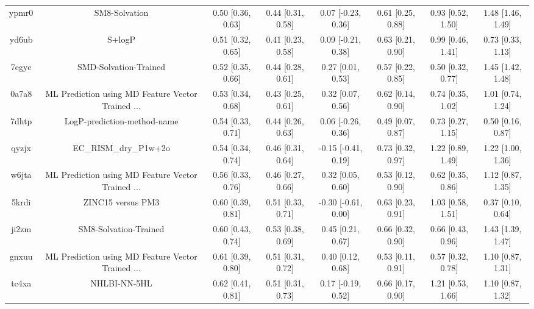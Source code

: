 \documentclass{article}
\begin{document}
\begin{center}
\begin{longtable}{|cccccccc|}
 ypmr0 &                                      SM8-Solvation &  0.50 [0.36, 0.63] &  0.44 [0.31, 0.58] &    0.07 [-0.23, 0.36] &  0.61 [0.25, 0.88] &    0.93 [0.52, 1.50] &     1.48 [1.46, 1.49] \\
 yd6ub &                                             S+logP &  0.51 [0.32, 0.65] &  0.41 [0.23, 0.58] &    0.09 [-0.21, 0.38] &  0.63 [0.21, 0.90] &    0.99 [0.46, 1.41] &     0.73 [0.33, 1.13] \\
 7egyc &                              SMD-Solvation-Trained &  0.52 [0.35, 0.66] &  0.44 [0.28, 0.61] &     0.27 [0.01, 0.53] &  0.57 [0.22, 0.85] &    0.50 [0.32, 0.77] &     1.45 [1.42, 1.48] \\
 0a7a8 &  ML Prediction using MD Feature Vector Trained ... &  0.53 [0.34, 0.68] &  0.43 [0.25, 0.61] &     0.32 [0.07, 0.56] &  0.62 [0.14, 0.90] &    0.74 [0.35, 1.02] &     1.01 [0.74, 1.24] \\
 7dhtp &                        LogP-prediction-method-name &  0.54 [0.33, 0.71] &  0.44 [0.26, 0.63] &    0.06 [-0.26, 0.36] &  0.49 [0.07, 0.87] &    0.73 [0.27, 1.15] &     0.50 [0.16, 0.87] \\
 qyzjx &                              EC\_RISM\_dry\_P1w+2o &  0.54 [0.34, 0.74] &  0.46 [0.31, 0.64] &   -0.15 [-0.41, 0.19] &  0.73 [0.32, 0.97] &    1.22 [0.89, 1.49] &     1.22 [1.00, 1.36] \\
 w6jta &  ML Prediction using MD Feature Vector Trained ... &  0.56 [0.33, 0.76] &  0.46 [0.27, 0.66] &     0.32 [0.05, 0.60] &  0.53 [0.12, 0.90] &    0.62 [0.35, 0.86] &     1.12 [0.87, 1.35] \\
 5krdi &                                  ZINC15 versus PM3 &  0.60 [0.39, 0.81] &  0.51 [0.33, 0.71] &   -0.30 [-0.61, 0.00] &  0.63 [0.23, 0.91] &    1.03 [0.58, 1.51] &     0.37 [0.10, 0.64] \\
 ji2zm &                              SM8-Solvation-Trained &  0.60 [0.43, 0.74] &  0.53 [0.38, 0.69] &     0.45 [0.21, 0.67] &  0.66 [0.32, 0.90] &    0.66 [0.43, 0.96] &     1.43 [1.39, 1.47] \\
 gnxuu &  ML Prediction using MD Feature Vector Trained ... &  0.61 [0.39, 0.80] &  0.51 [0.31, 0.72] &     0.40 [0.12, 0.68] &  0.53 [0.11, 0.91] &    0.57 [0.32, 0.78] &     1.10 [0.87, 1.31] \\
 tc4xa &                                       NHLBI-NN-5HL &  0.62 [0.41, 0.81] &  0.51 [0.31, 0.73] &    0.17 [-0.19, 0.52] &  0.66 [0.17, 0.90] &    1.21 [0.53, 1.66] &     1.10 [0.87, 1.32] \\

\end{longtable}
\end{center}
\end{document}
